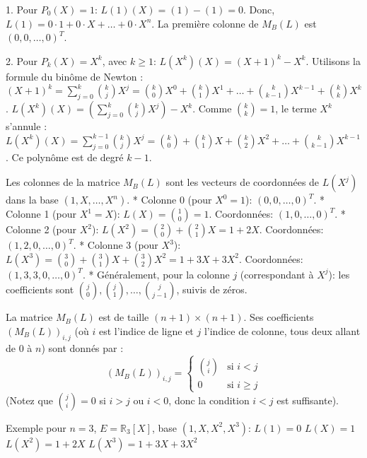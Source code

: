 \documentclass{report}
\begin{document}
1.  Pour $P_0(X) = 1$:
    $L(1)(X) = (1) - (1) = 0$.
    Donc, $L(1) = 0 \cdot 1 + 0 \cdot X + \dots + 0 \cdot X^n$. La première colonne de $M_B(L)$ est $(0, 0, \dots, 0)^T$.

2.  Pour $P_k(X) = X^k$, avec $k \ge 1$:
    $L(X^k)(X) = (X+1)^k - X^k$.
    Utilisons la formule du binôme de Newton : $(X+1)^k = \sum_{j=0}^k \binom{k}{j} X^j = \binom{k}{0} X^0 + \binom{k}{1} X^1 + \dots + \binom{k}{k-1} X^{k-1} + \binom{k}{k} X^k$.
    $L(X^k)(X) = \left( \sum_{j=0}^k \binom{k}{j} X^j \right) - X^k$.
    Comme $\binom{k}{k}=1$, le terme $X^k$ s'annule :
    $L(X^k)(X) = \sum_{j=0}^{k-1} \binom{k}{j} X^j = \binom{k}{0} + \binom{k}{1} X + \binom{k}{2} X^2 + \dots + \binom{k}{k-1} X^{k-1}$.
    Ce polynôme est de degré $k-1$.

Les colonnes de la matrice $M_B(L)$ sont les vecteurs de coordonnées de $L(X^j)$ dans la base $(1, X, \dots, X^n)$.
*   Colonne 0 (pour $X^0=1$): $(0, 0, \dots, 0)^T$.
*   Colonne 1 (pour $X^1=X$): $L(X) = \binom{1}{0} = 1$. Coordonnées: $(1, 0, \dots, 0)^T$.
*   Colonne 2 (pour $X^2$): $L(X^2) = \binom{2}{0} + \binom{2}{1} X = 1 + 2X$. Coordonnées: $(1, 2, 0, \dots, 0)^T$.
*   Colonne 3 (pour $X^3$): $L(X^3) = \binom{3}{0} + \binom{3}{1} X + \binom{3}{2} X^2 = 1 + 3X + 3X^2$. Coordonnées: $(1, 3, 3, 0, \dots, 0)^T$.
*   Généralement, pour la colonne $j$ (correspondant à $X^j$): les coefficients sont $\binom{j}{0}, \binom{j}{1}, \dots, \binom{j}{j-1}$, suivis de zéros.

La matrice $M_B(L)$ est de taille $(n+1) \times (n+1)$. Ses coefficients $(M_B(L))_{i,j}$ (où $i$ est l'indice de ligne et $j$ l'indice de colonne, tous deux allant de 0 à $n$) sont donnés par :
$$(M_B(L))_{i,j} = \begin{cases} \binom{j}{i} & \text{si } i < j \\ 0 & \text{si } i \ge j \end{cases}$$
(Notez que $\binom{j}{i}=0$ si $i>j$ ou $i<0$, donc la condition $i<j$ est suffisante).

Exemple pour $n=3$, $E = \mathbb{R}_3[X]$, base $(1, X, X^2, X^3)$:
$L(1) = 0$
$L(X) = 1$
$L(X^2) = 1 + 2X$
$L(X^3) = 1 + 3X + 3X^2$
\end{document}
